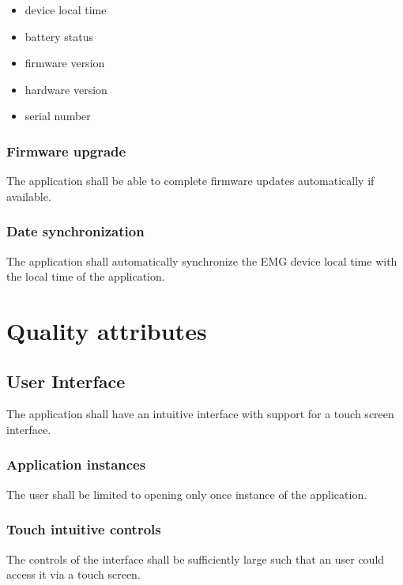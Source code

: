\documentclass[12pt,a4paper]{article}
\begin{document}
\begin{itemize}
\item device local time
\item battery status
\item firmware version
\item hardware version
\item serial number
\end{itemize}

\subsubsection{Firmware upgrade}

The application shall be able to complete firmware updates automatically if available.

\subsubsection{Date synchronization}

The application shall automatically synchronize the EMG device local time with the local time of the application.

\newpage

\section{Quality attributes}

\subsection{User Interface}

The application shall have an intuitive interface with support for a touch screen interface.

\subsubsection{Application instances}

The user shall be limited to opening only once instance of the application.

\subsubsection{Touch intuitive controls}

The controls of the interface shall be sufficiently large such that an user could access it via a touch screen.
\end{document}
